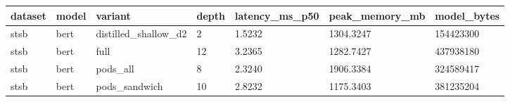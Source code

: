 \begin{tabular}{lllllll}
\hline
dataset & model & variant & depth & latency\_ms\_p50 & peak\_memory\_mb & model\_bytes \\
\hline
stsb & bert & distilled\_shallow\_d2 & 2 & 1.5232 & 1304.3247 & 154423300 \\
stsb & bert & full & 12 & 3.2365 & 1282.7427 & 437938180 \\
stsb & bert & pods\_all & 8 & 2.3240 & 1906.3384 & 324589417 \\
stsb & bert & pods\_sandwich & 10 & 2.8232 & 1175.3403 & 381235204 \\
\hline
\end{tabular}
